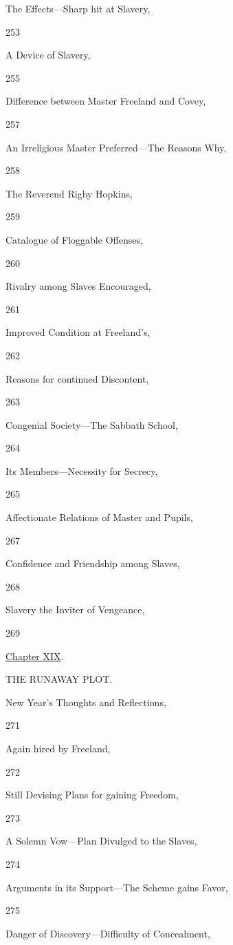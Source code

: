 The Effects---Sharp hit at Slavery,

253

A Device of Slavery,

255

Difference between Master Freeland and Covey,

257

An Irreligious Master Preferred---The Reasons Why,

258

The Reverend Rigby Hopkins,

259

Catalogue of Floggable Offenses,

260

Rivalry among Slaves Encouraged,

261

Improved Condition at Freeland's,

262

Reasons for continued Discontent,

263

Congenial Society---The Sabbath School,

264

Its Members---Necessity for Secrecy,

265

Affectionate Relations of Master and Pupils,

267

Confidence and Friendship among Slaves,

268

Slavery the Inviter of Vengeance,

269

\href{/wiki/My_Bondage_and_My_Freedom_(1855)/Chapter_XIX}{Chapter XIX}.

THE RUNAWAY PLOT.

New Year's Thoughts and Reflections,

271

Again hired by Freeland,

272

Still Devising Plans for gaining Freedom,

273

A Solemn Vow---Plan Divulged to the Slaves,

274

Arguments in its Support---The Scheme gains Favor,

275

Danger of Discovery---Difficulty of Concealment,

